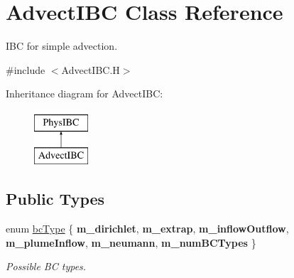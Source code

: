 \hypertarget{class_advect_i_b_c}{}\section{Advect\+I\+BC Class Reference}
\label{class_advect_i_b_c}


I\+BC for simple advection.  




{\ttfamily \#include $<$Advect\+I\+B\+C.\+H$>$}

Inheritance diagram for Advect\+I\+BC\+:\begin{figure}[H]
\begin{center}
\leavevmode
\includegraphics[height=2.000000cm]{class_advect_i_b_c}
\end{center}
\end{figure}
\subsection*{Public Types}
\begin{DoxyCompactItemize}
\item 
\mbox{\label{class_advect_i_b_c_ad4d8474d7904dab87483522ebe711b8e}} 
enum \hyperlink{class_advect_i_b_c_ad4d8474d7904dab87483522ebe711b8e}{bc\+Type} \{ \newline
{\bfseries m\+\_\+dirichlet}, 
{\bfseries m\+\_\+extrap}, 
{\bfseries m\+\_\+inflow\+Outflow}, 
{\bfseries m\+\_\+plume\+Inflow}, 
\newline
{\bfseries m\+\_\+neumann}, 
{\bfseries m\+\_\+num\+B\+C\+Types}
 \}\begin{DoxyCompactList}\small\item\em Possible BC types. \end{DoxyCompactList}
\end{DoxyCompactItemize}
